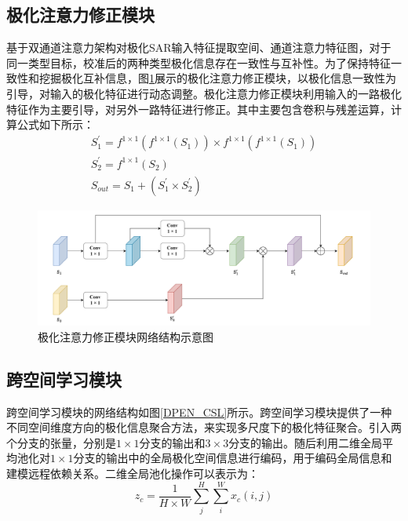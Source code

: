 \subsection{极化注意力修正模块}
\label{sec:极化注意力修正模块}
基于双通道注意力架构对极化SAR输入特征提取空间、通道注意力特征图，对于同一类型目标，校准后的两种类型极化信息存在一致性与互补性。为了保持特征一致性和挖掘极化互补信息，图\ref{DPEN_WFM}展示的极化注意力修正模块，以极化信息一致性为引导，对输入的极化特征进行动态调整。极化注意力修正模块利用输入的一路极化特征作为主要引导，对另外一路特征进行修正。其中主要包含卷积与残差运算，计算公式如下所示：
\begin{gather}
    S_{1}^{\prime}=f^{1\times 1}\left( f^{1\times 1}\left( S_1 \right) \right) \times f^{1\times 1}\left( f^{1\times 1}\left( S_1 \right) \right)
    \\
    S_{2}^{\prime}=f^{1\times 1}\left( S_2 \right)
    \\
    S_{out}=S_1+\left( S_{1}^{\prime}\times S_{2}^{\prime} \right)
\end{gather}

\begin{figure}[h]
    \centering
    \includegraphics[width=14cm]{pic/chapter3/极化注意力修正.pdf}
    \caption{极化注意力修正模块网络结构示意图}
    \label{DPEN_WFM}
\end{figure}


\subsection{跨空间学习模块}
\label{sec:跨空间学习模块}
跨空间学习模块的网络结构如图\ref{DPEN_CSL}所示。跨空间学习模块提供了一种不同空间维度方向的极化信息聚合方法，来实现多尺度下的极化特征聚合。引入两个分支的张量，分别是$1\times 1$分支的输出和$3 \times 3$分支的输出。随后利用二维全局平均池化对$1\times 1$分支的输出中的全局极化空间信息进行编码，用于编码全局信息和建模远程依赖关系。二维全局池化操作可以表示为：
\begin{equation}
    z_c=\frac{1}{H\times W}\sum_{j}^{H}\sum_{i}^{W}x_c(i,j)
\end{equation}

